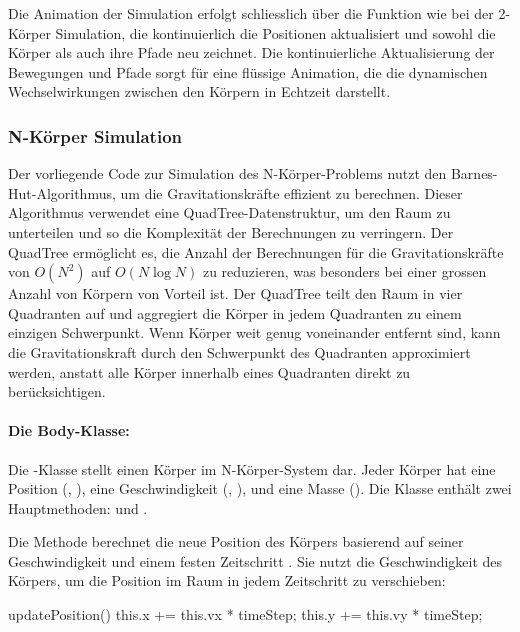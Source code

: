 \documentclass[a4paper,12pt,twoside]{article}
\begin{document}
Die Animation der Simulation erfolgt schliesslich über die Funktion  wie bei der 2-Körper Simulation, die kontinuierlich die Positionen aktualisiert und sowohl die Körper als auch ihre Pfade neu zeichnet. Die kontinuierliche Aktualisierung der Bewegungen und Pfade sorgt für eine flüssige Animation, die die dynamischen Wechselwirkungen zwischen den Körpern in Echtzeit darstellt.

\subsubsection{N-Körper Simulation}

Der vorliegende Code zur Simulation des N-Körper-Problems nutzt den Barnes-Hut-Algorithmus, um die Gravitationskräfte effizient zu berechnen. Dieser Algorithmus verwendet eine QuadTree-Datenstruktur, um den Raum zu unterteilen und so die Komplexität der Berechnungen zu verringern. Der QuadTree ermöglicht es, die Anzahl der Berechnungen für die Gravitationskräfte von \(O(N^2)\) auf \(O(N \log N)\) zu reduzieren, was besonders bei einer grossen Anzahl von Körpern von Vorteil ist. Der QuadTree teilt den Raum in vier Quadranten auf und aggregiert die Körper in jedem Quadranten zu einem einzigen Schwerpunkt. Wenn Körper weit genug voneinander entfernt sind, kann die Gravitationskraft durch den Schwerpunkt des Quadranten approximiert werden, anstatt alle Körper innerhalb eines Quadranten direkt zu berücksichtigen.

\paragraph{Die Body-Klasse:}
Die -Klasse stellt einen Körper im N-Körper-System dar. Jeder Körper hat eine Position (, ), eine Geschwindigkeit (, ), und eine Masse (). Die Klasse enthält zwei Hauptmethoden:  und .

Die Methode  berechnet die neue Position des Körpers basierend auf seiner Geschwindigkeit und einem festen Zeitschritt . Sie nutzt die Geschwindigkeit des Körpers, um die Position im Raum in jedem Zeitschritt zu verschieben:

\begin{javascript}
updatePosition() {
    this.x += this.vx * timeStep;
    this.y += this.vy * timeStep;
}
\end{javascript}
\end{document}
